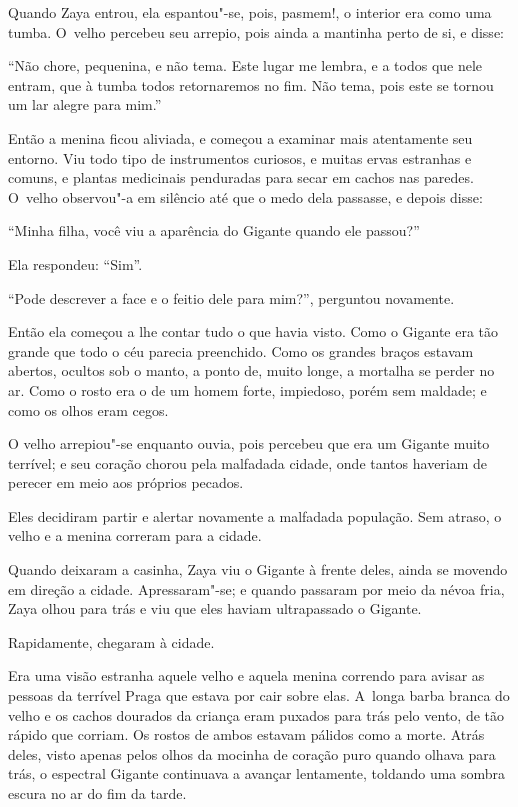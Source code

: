 Quando Zaya entrou, ela espantou"-se, pois, pasmem!, o interior era como
uma tumba. O~velho percebeu seu arrepio, pois ainda a mantinha perto de
si, e disse:

``Não chore, pequenina, e não tema. Este lugar me lembra, e a todos que
nele entram, que à tumba todos retornaremos no fim. Não tema, pois este
se tornou um lar alegre para mim.''

Então a menina ficou aliviada, e começou a examinar mais atentamente seu
entorno. Viu todo tipo de instrumentos curiosos, e muitas ervas
estranhas e comuns, e plantas medicinais penduradas para secar em cachos
nas paredes. O~velho observou"-a em silêncio até que o medo dela
passasse, e depois disse:

``Minha filha, você viu a aparência do Gigante quando ele passou?''

Ela respondeu: ``Sim''.

``Pode descrever a face e o feitio dele para mim?'', perguntou
novamente.

Então ela começou a lhe contar tudo o que havia visto. Como o
Gigante era tão grande que todo o céu parecia preenchido. Como os
grandes braços estavam abertos, ocultos sob o manto, a ponto de, muito longe,
a mortalha se perder no ar. Como o rosto era o de um homem forte,
impiedoso, porém sem maldade; e como os olhos eram cegos.

O velho arrepiou"-se enquanto ouvia, pois percebeu que era um Gigante
muito terrível; e seu coração chorou pela malfadada cidade, onde tantos
haveriam de perecer em meio aos próprios pecados.

Eles decidiram partir e alertar novamente a malfadada população. Sem
atraso, o velho e a menina correram para a cidade.

Quando deixaram a casinha, Zaya viu o Gigante à frente deles, ainda
se movendo em direção a cidade. Apressaram"-se; e quando passaram por meio
da névoa fria, Zaya olhou para trás e viu que eles haviam ultrapassado o Gigante.

Rapidamente, chegaram à cidade.

Era uma visão estranha aquele velho e aquela menina correndo para avisar
as pessoas da terrível Praga que estava por cair sobre elas. A~longa
barba branca do velho e os cachos dourados da criança eram puxados para trás pelo vento,
de tão rápido que corriam. Os rostos de ambos estavam pálidos
como a morte. Atrás deles, visto apenas pelos olhos da mocinha de
coração puro quando olhava para trás, o espectral Gigante
continuava a avançar lentamente, toldando uma sombra escura no ar do
fim da tarde.

